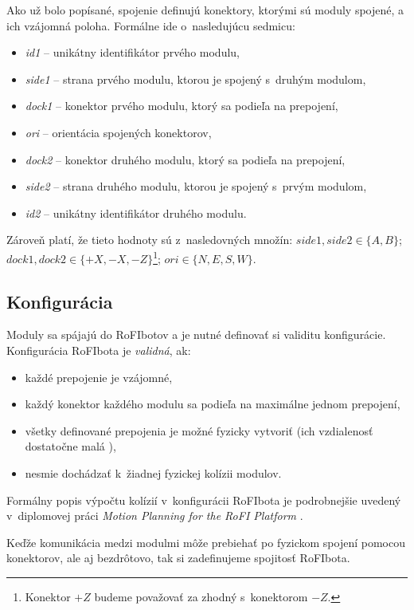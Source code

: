 \documentclass[
  printed, %
  oneside, %
  notable,   %
  nolof,     %
  nolot,     %
]{fithesis3}
\begin{document}
Ako už bolo popísané, spojenie definujú konektory, ktorými sú moduly spojené, a ich vzájomná poloha. Formálne ide o~nasledujúcu sedmicu: 
\begin{itemize}
    \item \textit{id1} -- unikátny identifikátor prvého modulu, 
    \item \textit{side1} -- strana prvého modulu, ktorou je spojený s~druhým modulom, 
    \item \textit{dock1} -- konektor prvého modulu, ktorý sa podieľa na prepojení,
    \item \textit{ori} -- orientácia spojených konektorov,
    \item \textit{dock2} -- konektor druhého modulu, ktorý sa podieľa na prepojení,
    \item \textit{side2} -- strana druhého modulu, ktorou je spojený s~prvým modulom, 
    \item \textit{id2} -- unikátny identifikátor druhého modulu. 
\end{itemize}
Zároveň platí, že tieto hodnoty sú z~nasledovných množín: $side1, side2 \in \{A, B\}$; $dock1, dock2 \in \{+X, -X, -Z\}$\footnote{Konektor $+Z$ budeme považovať za zhodný s~konektorom $-Z$. }; $ori \in \{N, E, S, W\}$.

\subsection{Konfigurácia}
\label{sec:formalSpecCfg}
Moduly sa spájajú do RoFIbotov a je nutné definovať si validitu konfigurácie. Konfigurácia RoFIbota je \textit{validná}, ak: 
\begin{itemize}
    \item každé prepojenie je vzájomné,
    \item každý konektor každého modulu sa podieľa na maximálne jednom prepojení, 
    \item všetky definované prepojenia je možné fyzicky vytvoriť (ich vzdialenosť dostatočne malá \cite{rofiCom}), 
    \item nesmie dochádzať k~žiadnej fyzickej kolízii modulov. 
\end{itemize}
Formálny popis výpočtu kolízií v~konfigurácii RoFIbota je podrobnejšie uvedený v~diplomovej práci \textit{Motion Planning for the RoFI Platform} \cite{vozarovaMasterThesis}. 

Keďže komunikácia medzi modulmi môže prebiehať po fyzickom spojení pomocou konektorov, ale aj bezdrôtovo, tak si zadefinujeme spojitosť RoFIbota. 
\end{document}
